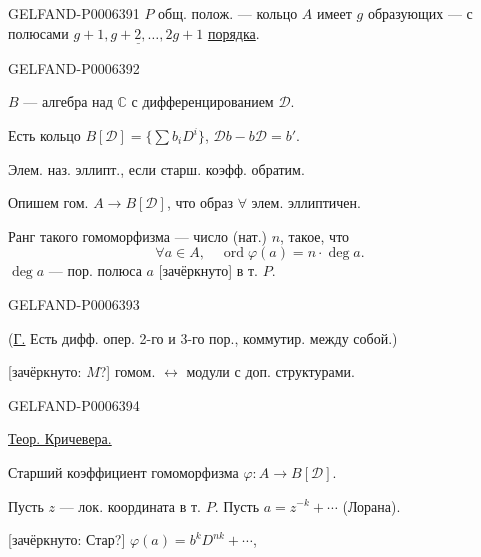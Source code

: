 \begin{GelfandAdjacentEvidence}{GELFAND-P000639}{1}
\(P\) общ. полож. --- кольцо \(A\) имеет \(g\) образующих ---
с полюсами \(\underline{g+1,g+2,\ldots,2g+1}\) \underline{порядка}.
\end{GelfandAdjacentEvidence}
\begin{GelfandAdjacentEvidence}{GELFAND-P000639}{2}


\(B\) --- алгебра над \(\mathbb C\) с дифференцированием \(\mathcal D\).

Есть кольцо \(B[\mathcal D]=\{\sum b_iD^i\}\),
\(\mathcal Db-b\mathcal D=b'\).

Элем. наз. эллипт., если старш. коэфф. обратим.

Опишем гом. \(A\to B[\mathcal D]\), что образ \(\forall\) элем. эллиптичен.

Ранг такого гомоморфизма --- число (нат.) \(n\), такое, что
\[
\forall a\in A,\quad \operatorname{ord}\varphi(a)=n\cdot\operatorname{deg}a.
\]
\(\operatorname{deg}a\) --- пор. полюса \(a\) [зачёркнуто] в т. \(P\).
\end{GelfandAdjacentEvidence}
\begin{GelfandAdjacentEvidence}{GELFAND-P000639}{3}


(\underline{Г.} Есть дифф. опер. 2-го и 3-го пор., коммутир. между собой.)

[зачёркнуто: \(M\)?] гомом. \(\longleftrightarrow\) модули с доп. структурами.
\end{GelfandAdjacentEvidence}
\begin{GelfandAdjacentEvidence}{GELFAND-P000639}{4}


\underline{Теор. Кричевера.}

Старший коэффициент гомоморфизма \(\varphi:A\to B[\mathcal D]\).

Пусть \(z\) --- лок. координата в т. \(P\).
Пусть \(a=z^{-k}+\cdots\) (Лорана).

[зачёркнуто: Стар?] \(\varphi(a)=b^k D^{nk}+\cdots\),
\end{GelfandAdjacentEvidence}
